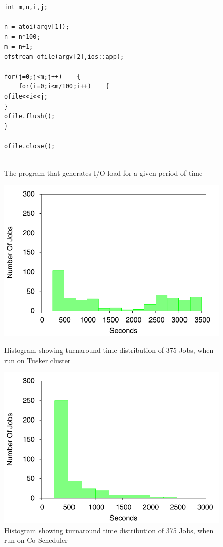 \documentclass[ms,electronic,double]{nuthesis}
\begin{document}
\begin{figure}[htbp!]

\begin{lstlisting}

int m,n,i,j;

n = atoi(argv[1]);
n = n*100;
m = n+1;
ofstream ofile(argv[2],ios::app);

for(j=0;j<m;j++)	{
	for(i=0;i<m/100;i++)	{
ofile<<i<<j;
}
ofile.flush();
}

ofile.close();


\end{lstlisting}
\caption{The program that generates I/O load for a given period of time}
\label{fig:ioload}
\end{figure}
\FloatBarrier


\begin{figure}[h!]
\begin{center}
\includegraphics{images/tusker_histogram}
\caption{Histogram showing turnaround time distribution of 375 Jobs, when run on Tusker cluster}
\label{fig:tusker_histogram}
\end{center}

\begin{center}
\includegraphics{images/coscheduler_histogram}
\caption{Histogram showing turnaround time distribution of 375 Jobs, when run on Co-Scheduler}
\label{fig:coscheduler_histogram}
\end{center}


\end{figure}
\FloatBarrier
\end{document}
